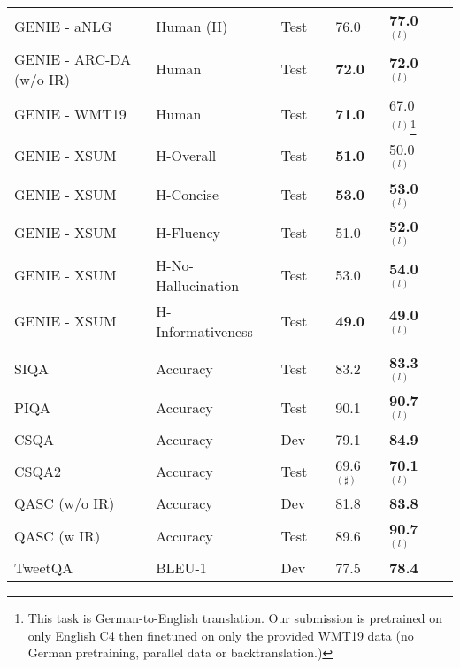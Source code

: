 \documentclass[10pt]{article}
\begin{document}
\begin{center}
\begin{longtable}{lllllll}
   GENIE - aNLG & Human (H) & Test & \citeauthor{genie} & 76.0 & \textbf{77.0}$^{(l)}$  \\
   GENIE - ARC-DA (w/o IR) & Human & Test & \citeauthor{khashabi2020unifiedqa} & \textbf{72.0} & \textbf{72.0}$^{(l)}$  \\
   GENIE - WMT19 & Human & Test & \citeauthor{genie} & \textbf{71.0} & 67.0$^{(l)}$\footnote{This task is German-to-English translation. Our submission is pretrained on only English C4 then finetuned on only the provided WMT19 data (no German pretraining, parallel data or backtranslation.)}  \\
   GENIE - XSUM & H-Overall & Test & \citeauthor{controlprefixes} & \textbf{51.0} & 50.0$^{(l)}$  \\
   GENIE - XSUM & H-Concise & Test & \citeauthor{controlprefixes} & \textbf{53.0} & \textbf{53.0}$^{(l)}$  \\  
   GENIE - XSUM & H-Fluency & Test & \citeauthor{controlprefixes} & 51.0 & \textbf{52.0}$^{(l)}$  \\
   GENIE - XSUM & H-No-Hallucination & Test & \citeauthor{controlprefixes} & 53.0 & \textbf{54.0}$^{(l)}$  \\
   GENIE - XSUM & H-Informativeness & Test & \citeauthor{controlprefixes} & \textbf{49.0} & \textbf{49.0}$^{(l)}$  \\
   \\
   
    SIQA & Accuracy & Test & \citeauthor{lourie2021unicorn} & 83.2 &  \textbf{83.3}$^{(l)}$  \\ 
    PIQA & Accuracy & Test & \citeauthor{lourie2021unicorn}  & 90.1 & \textbf{90.7}$^{(l)}$\\ 
    CSQA & Accuracy & Dev & \citeauthor{lourie2021unicorn}  & 79.1 & \textbf{84.9} \\ 
    CSQA2 & Accuracy & Test & \citeauthor{lourie2021unicorn} & 69.6$^{(\sharp)}$ & \textbf{70.1}$^{(l)}$ \\
    QASC (w/o IR) & Accuracy & Dev & \citeauthor{khashabi2020unifiedqa}& 81.8 & \textbf{83.8} \\
    QASC (w IR) & Accuracy & Test & \citeauthor{khashabi2020unifiedqa} & 89.6 & \textbf{90.7}$^{(l)}$ \\ 
    TweetQA & BLEU-1 & Dev & \citeauthor{khashabi2022unifiedqa} & 77.5 & \textbf{78.4} \\
   

\end{longtable}
\end{center}
\end{document}
